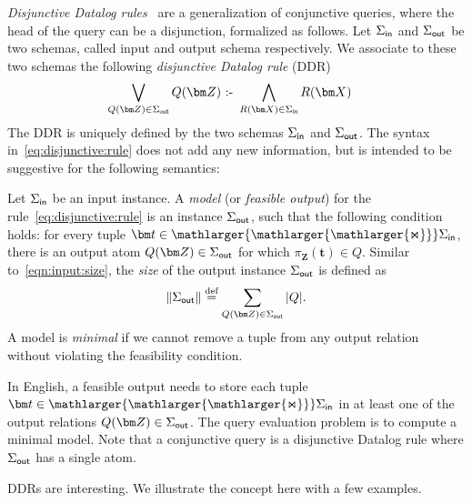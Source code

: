 \documentclass{theoretics}
\newcommand{\norm}[1]{\|#1\|}
\newcommand{\defeq}{\stackrel{\text{def}}{=}}
\newcommand{\cd}{\text{ :- }}
\newcommand{\bigjoin}{\mathlarger{\mathlarger{\mathlarger{\Join}}}}
\newcommand{\inn}{\text{\sf in}}
\newcommand{\out}{\text{\sf out}}
\begin{document}
{\em Disjunctive Datalog rules}~\cite{DBLP:journals/tods/EiterGM97} are a
generalization of conjunctive queries, where the head of the query
can be a disjunction, formalized as follows.
Let $\Sigma_{\inn}$ and $\Sigma_{\out}$ be two schemas,
called input and output schema respectively.  We associate to these two schemas the
following \emph{disjunctive Datalog rule} (DDR)
%
\begin{align}
  \bigvee_{Q(\bm Z)\in \Sigma_{\out}} Q(\bm Z) &\cd \bigwedge_{R(\bm X)\in\Sigma_{\inn}} R(\bm X) \label{eq:disjunctive:rule}
\end{align}
%
The DDR is uniquely defined by the two schemas
$\Sigma_{\inn}$ and $\Sigma_{\out}$.  The syntax
in~\eqref{eq:disjunctive:rule} does not add any new information, but
is intended to be suggestive for the following semantics:

\begin{definition} \label{def:feasible} Let $\Sigma_{\inn}$ be an input instance.  A {\em
model} (or {\em feasible output}) for the rule~\eqref{eq:disjunctive:rule} is an instance
$\Sigma_{\out}$, such that the following condition holds:
for every tuple $\bm t \in \bigjoin \Sigma_{\inn}$, there is an output atom
$Q(\bm Z) \in \Sigma_{\out}$ for which $\pi_{\bm Z}(\bm t) \in Q$.
Similar to~\eqref{eqn:input:size},
the {\em size} of the output instance $\Sigma_{\out}$ is defined as
\begin{align}
\norm{\Sigma_{\out}} \defeq \sum_{Q(\bm Z) \in \Sigma_{\out}} |Q|. \label{eqn:ddr:size}
\end{align}
A model is {\em minimal} if we cannot remove a tuple from any output relation without
violating the feasibility condition.
\end{definition}

%
In English, a feasible output needs to store each tuple
$\bm t \in \bigjoin \Sigma_{\inn}$ in at least one of the output
relations $Q(\bm Z) \in \Sigma_{\out}$.  The query evaluation problem
is to compute a minimal model. Note that a conjunctive query is a disjunctive Datalog rule
where $\Sigma_{\out}$ has a single atom.

DDRs are interesting. We illustrate the concept here with a few examples.
\end{document}
